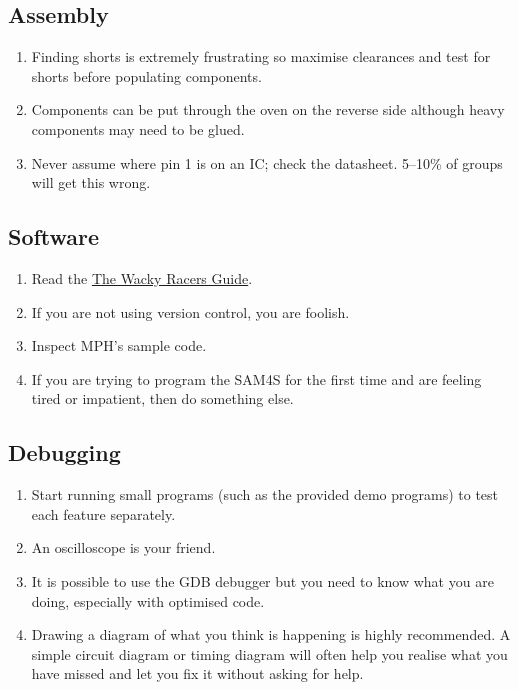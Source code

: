 \documentclass[11pt, a4paper]{article}
\newcommand{\theguide}{\href{https://eng-git.canterbury.ac.nz/wacky-racers/wacky-racers/-/blob/master/doc/guide/guide.pdf}{The Wacky Racers Guide}}
\begin{document}
\subsection{Assembly}

\begin{enumerate}
\item Finding shorts is extremely frustrating so maximise clearances
  and test for shorts before populating components.

\item Components can be put through the oven on the reverse side
  although heavy components may need to be glued.

\item Never assume where pin 1 is on an IC; check the datasheet.
  5--10\% of groups will get this wrong.

\end{enumerate}


\subsection{Software}

\begin{enumerate}
\item Read the \theguide.

\item If you are not using version control, you are foolish.

\item Inspect MPH's sample code.

\item If you are trying to program the SAM4S for the first time and
  are feeling tired or impatient, then do something else.
\end{enumerate}


\subsection{Debugging}

\begin{enumerate}
\item Start running small programs (such as the provided demo
  programs) to test each feature separately.

\item An oscilloscope is your friend.

\item It is possible to use the GDB debugger but you need to know what
  you are doing, especially with optimised code.

\item Drawing a diagram of what you think is happening is highly
  recommended. A simple circuit diagram or timing diagram will often
  help you realise what you have missed and let you fix it without
  asking for help.

\end{enumerate}
\end{document}
